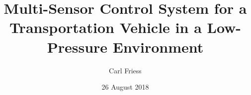 \documentclass[%
 oneside,      %
 openany,      %
 halfparskip,  %
]{scrbook}
\title{Multi-Sensor Control System for a Transportation Vehicle in a Low-Pressure Environment}
\author{Carl Friess}
\date{26 August 2018}
\begin{document}
\dominitoc

\frontmatter







\tableofcontents
\listoffigures
\listoftables



\mainmatter







\appendix



\backmatter



\nocite*{} %


\end{document}
